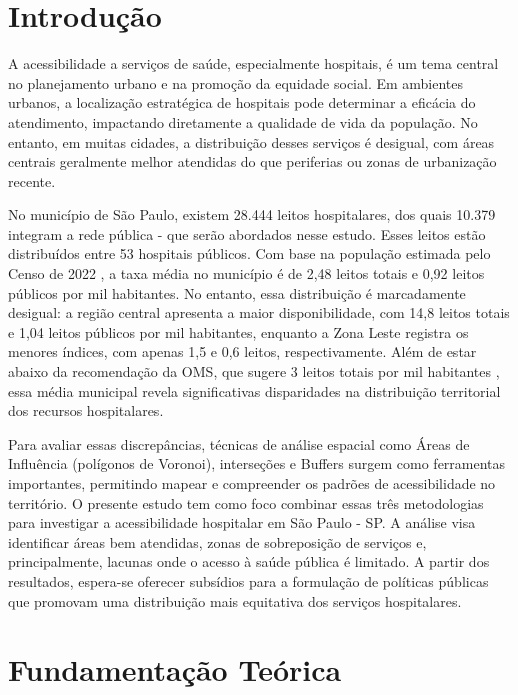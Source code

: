 \documentclass[
  8pt,
]{article}
\begin{document}
\begin{multicols}{2}

\section{Introdução}


A acessibilidade a serviços de saúde, especialmente hospitais, é um tema central no planejamento urbano e na promoção da equidade social. 
Em ambientes urbanos, a localização estratégica de hospitais pode determinar a eficácia do atendimento, impactando diretamente a qualidade de vida da população. No entanto, em muitas cidades, a distribuição desses serviços é desigual, com áreas centrais geralmente melhor atendidas do que periferias ou zonas de urbanização recente.

No município de São Paulo, existem 28.444 leitos hospitalares, dos quais 10.379 integram a rede pública - que serão abordados nesse estudo. Esses leitos estão distribuídos entre 53 hospitais públicos. Com base na população estimada pelo Censo de 2022 , a taxa média no município é de 2,48 leitos totais e 0,92 leitos públicos por mil habitantes. No entanto, essa distribuição é marcadamente desigual: a região central apresenta a maior disponibilidade, com 14,8 leitos totais e 1,04 leitos públicos por mil habitantes, enquanto a Zona Leste registra os menores índices, com apenas 1,5 e 0,6 leitos, respectivamente. Além de estar abaixo da recomendação da OMS, que sugere 3 leitos totais por mil habitantes , essa média municipal revela significativas disparidades na distribuição territorial dos recursos hospitalares.

Para avaliar essas discrepâncias, técnicas de análise espacial como Áreas de Influência (polígonos de Voronoi), interseções e Buffers surgem como ferramentas importantes, permitindo mapear e compreender os padrões de acessibilidade no território.
O presente estudo tem como foco combinar essas três metodologias para investigar a acessibilidade hospitalar em São Paulo - SP. A análise visa identificar áreas bem atendidas, zonas de sobreposição de serviços e, principalmente, lacunas onde o acesso à saúde pública é limitado. A partir dos resultados, espera-se oferecer subsídios para a formulação de políticas públicas que promovam uma distribuição mais equitativa dos serviços hospitalares.

\section{Fundamentação Teórica}


\end{multicols}
\end{document}
